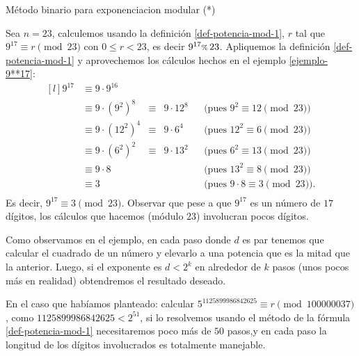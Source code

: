 \begin{section}{Método binario para exponenciacion modular (*)}
  \begin{ejemplo}
    Sea $n = 23$, calculemos usando  la definición \ref{def-potencia-mod-1}, $r$ tal que  $9^{17} \equiv r \pmod{23}$ con $0 \le r < 23$,  es decir $9^{17} {\scriptstyle \%}\, 23$. Apliquemos la definición \eqref{def-potencia-mod-1} y aprovechemos los cálculos hechos en el ejemplo \ref{ejemplo-9**17}:
    \begin{equation*}\label{eq-3**17-mod-21}
        \begin{matrix*}[l]
            9^{17}  &\equiv  9 \cdot 9^{16}& & &&\\
                    &\equiv  9 \cdot (9^{2})^8   &\equiv& 9 \cdot 12^8&&\text{(pues $9^2 \equiv 12 \pmod{23}$)} \\
                    &\equiv  9 \cdot (12^2)^4 &\equiv&  9 \cdot 6^4&&\text{(pues $12^2 \equiv 6\pmod{23}$)}  \\
                    &\equiv  9 \cdot (6^2)^2 &\equiv&  9 \cdot 13^2&&\text{(pues $6^2 \equiv 13 \pmod{23}$)}\\
                    &\equiv  9 \cdot 8 &&  &&\text{(pues $13^2 \equiv 8\pmod{23}$)}\\
                    &\equiv 3 &&  &&\text{(pues $9\cdot 8 \equiv 3 \pmod{23}$).}\\
        \end{matrix*}
    \end{equation*}
    Es decir, $9^{17} \equiv 3 \pmod{23}$. Observar que pese a que $9^{17}$ es un número de $17$ dígitos, los cálculos que hacemos (módulo $23$) involucran pocos dígitos.   

  \end{ejemplo}

Como observamos en el ejemplo,  en cada paso donde $d$ es par tenemos que calcular el cuadrado de un número y elevarlo a una potencia que es la mitad  que la anterior. Luego,  si  el exponente es $d < 2^k$ en alrededor de $k$ pasos (unos pocos más en realidad) obtendremos el resultado deseado. 

En  el caso  que habíamos planteado: calcular $ 5^{1125899986842625} \equiv r \pmod{100000037}$, como $1125899986842625 < 2^{51}$, si lo resolvemos usando el método de la fórmula \eqref{def-potencia-mod-1} necesitaremos poco más de $50$ pasos,y en cada paso la longitud de los dígitos involucrados es totalmente manejable. 



\end{section}
